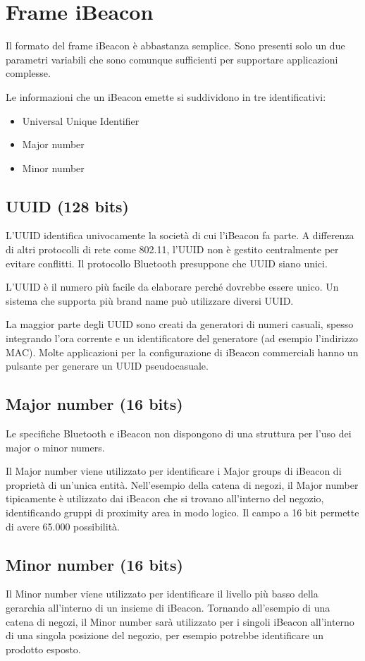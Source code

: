\section{Frame iBeacon}
Il formato del frame iBeacon è abbastanza semplice. Sono presenti solo un due parametri variabili che sono comunque sufficienti per supportare applicazioni complesse.

Le informazioni che un iBeacon emette si suddividono in tre identificativi:
\begin{itemize}
	\item Universal Unique Identifier
	\item Major number
	\item Minor number
\end{itemize}

\subsection{UUID (128 bits)}
L'UUID identifica univocamente la società di cui l'iBeacon fa parte. A differenza di altri protocolli di rete come 802.11, l'UUID non è gestito centralmente per evitare conflitti. Il protocollo Bluetooth presuppone che UUID siano unici.

L'UUID è il numero più facile da elaborare perché dovrebbe essere unico. Un sistema che supporta più brand name può utilizzare diversi UUID.

La maggior parte degli UUID sono creati da generatori di numeri casuali, spesso integrando l'ora corrente e un identificatore del generatore (ad esempio l'indirizzo MAC). Molte applicazioni per la configurazione di iBeacon commerciali hanno un pulsante per generare un UUID pseudocasuale.

\subsection{Major number (16 bits)}
Le specifiche Bluetooth e iBeacon non dispongono di una struttura per l'uso dei major o minor numers.

Il Major number viene utilizzato per identificare i Major groups di iBeacon di proprietà di un'unica entità. Nell'esempio della catena di negozi, il Major number tipicamente è utilizzato dai iBeacon che si trovano all'interno del negozio, identificando gruppi di proximity area in modo logico. Il campo a 16 bit permette di avere 65.000 possibilità.

\subsection{Minor number (16 bits)}
Il Minor number viene utilizzato per identificare il livello più basso della gerarchia all'interno di un insieme di iBeacon. Tornando all'esempio di una catena di negozi, il Minor number sarà utilizzato per i singoli iBeacon all'interno di una singola posizione del negozio, per esempio potrebbe identificare un prodotto esposto.


